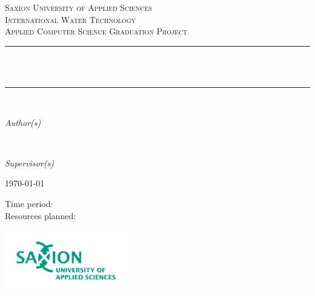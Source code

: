 \begin{titlepage}
  	\newcommand{\HRule}{\rule{\linewidth}{0.3mm}}
	\center
	\textsc{\LARGE Saxion University of Applied Sciences}\\[1.5cm]
	\textsc{\Large International Water Technology}\\[0.5cm]
	\textsc{\large Applied Computer Science Graduation Project}\\[0.5cm]
	\HRule\\[0.4cm]
	{\huge\bfseries \@title}\\[0.4cm]
	\HRule\\[1.5cm]

	\begin{minipage}{0.4\textwidth}
		\begin{flushleft}
			\large
			\textit{Author(s)}\\
			\@author %
		\end{flushleft}
	\end{minipage}
	~
	\begin{minipage}{0.4\textwidth}
		\begin{flushright}
			\large
			\textit{Supervisor(s)}\\
			\supervisors
		\end{flushright}
	\end{minipage}
	

	\vfill\vfill
		{\large\today}
    \vfill\vfill
    
    \footnotesize{Time period: \timePeriod}
    \\[0.3cm]
    \footnotesize{Resources planned: \resourcesPlanned}
    \vfill
    \homepage
    
    \vfill
    
    
	
	\vfill\vfill
	\includegraphics[width=0.4\textwidth]{./saxionlogo.png}
	\vfill
	 
	\vfill
	
\end{titlepage}
